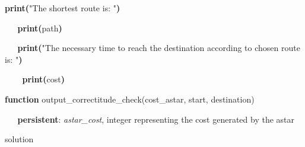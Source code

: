 \documentclass[12pt]{article}
\begin{document}
\tab \tab \tab \tab 
\vspace{\baselineskip}\begin{justify}
{\fontsize{8pt}{9.6pt}\selectfont \textbf{ \tabto{0.75in}  print(}"The shortest route is: "\textbf{)}\par}
\end{justify}\par

\begin{justify}
{\fontsize{8pt}{9.6pt}\selectfont \textbf{\ \   \tabto{0.75in}  print(}path\textbf{)}\par}
\end{justify}\par

\begin{justify}
{\fontsize{8pt}{9.6pt}\selectfont \textbf{\ \   \tabto{0.75in}  print(}"The necessary time to reach the destination according to chosen route is: "\textbf{)}\par}
\end{justify}\par

\begin{justify}
{\fontsize{8pt}{9.6pt}\selectfont \textbf{\ \ \   \tabto{0.75in}  print(}cost\textbf{)}\par}
\end{justify}\par


\vspace{\baselineskip}\tab 
\vspace{\baselineskip}\begin{adjustwidth}{0.5in}{0.0in}
\begin{justify}
{\fontsize{8pt}{9.6pt}\selectfont \textbf{function }output\_correctitude\_check(cost\_astar, start, destination)\par}
\end{justify}\par

\end{adjustwidth}

\begin{justify}
{\fontsize{8pt}{9.6pt}\selectfont \textbf{\ \   \tabto{0.75in} persistent}:\textit{ astar\_cost}, integer representing the cost generated by the astar\par}
\end{justify}\par

\begin{adjustwidth}{0.5in}{0.0in}
\begin{justify}
{\fontsize{8pt}{9.6pt}\selectfont  \tabto{0.75in} \tab \tab solution\par}
\end{justify}\par

\end{adjustwidth}
\end{document}
